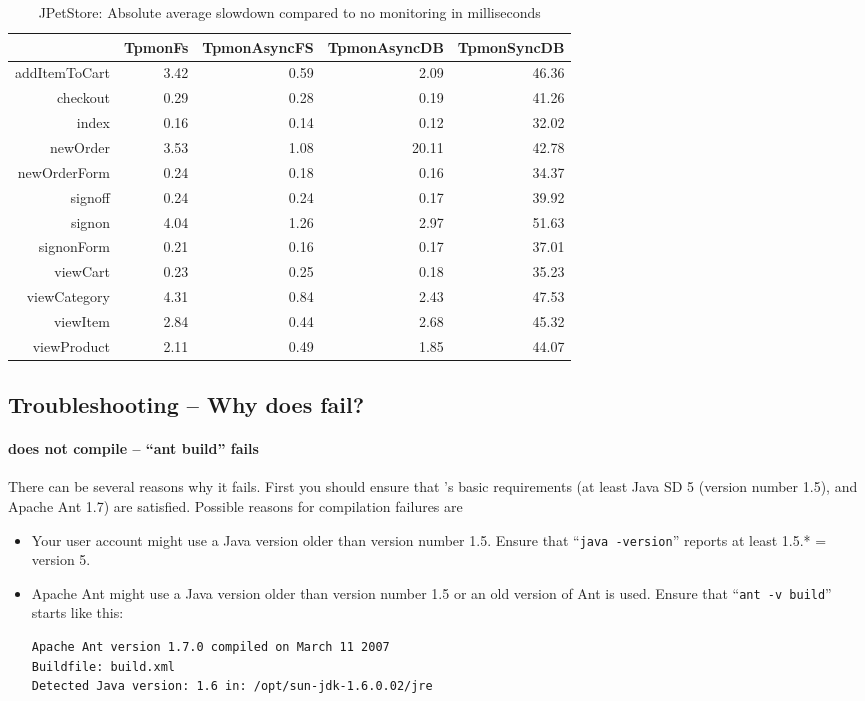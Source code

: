 \documentclass[a4paper,12pt]{scrartcl}
\begin{document}
\begin{table}
\centering
\begin{tabular}{rrrrr}
  \hline
 & TpmonFs & TpmonAsyncFS & TpmonAsyncDB & TpmonSyncDB \\
  \hline
addItemToCart & 3.42 & 0.59 & 2.09 & 46.36 \\
  checkout & 0.29 & 0.28 & 0.19 & 41.26 \\
  index & 0.16 & 0.14 & 0.12 & 32.02 \\
  newOrder & 3.53 & 1.08 & 20.11 & 42.78 \\
  newOrderForm & 0.24 & 0.18 & 0.16 & 34.37 \\
  signoff & 0.24 & 0.24 & 0.17 & 39.92 \\
  signon & 4.04 & 1.26 & 2.97 & 51.63 \\
  signonForm & 0.21 & 0.16 & 0.17 & 37.01 \\
  viewCart & 0.23 & 0.25 & 0.18 & 35.23 \\
  viewCategory & 4.31 & 0.84 & 2.43 & 47.53 \\
  viewItem & 2.84 & 0.44 & 2.68 & 45.32 \\
  viewProduct & 2.11 & 0.49 & 1.85 & 44.07 \\
   \hline
\end{tabular}\caption{JPetStore: Absolute average slowdown compared to no monitoring in milliseconds}\label{generatedTpmonPerfTabel2}
\end{table}


\subsection{Troubleshooting -- Why does \tpmon{} fail?}
\paragraph{\tpmon{} does not compile -- ``ant build'' fails} There can be several reasons why it fails. First you should ensure that
\tpmon{}'s basic requirements (at least Java SD 5 (version number 1.5), and Apache Ant 1.7) are satisfied. Possible reasons for compilation failures are
\begin{itemize}
 \item Your user account might use a Java version older than version number 1.5. Ensure that ``\texttt{java -version}'' reports at least 1.5.*  = version 5.
\item Apache Ant might use a Java version older than version number 1.5 or an old version of Ant is used. Ensure that ``\texttt{ant -v build}'' starts like this: \begin{lstlisting}[]
Apache Ant version 1.7.0 compiled on March 11 2007
Buildfile: build.xml
Detected Java version: 1.6 in: /opt/sun-jdk-1.6.0.02/jre
\end{lstlisting}
\end{itemize}
\end{document}
